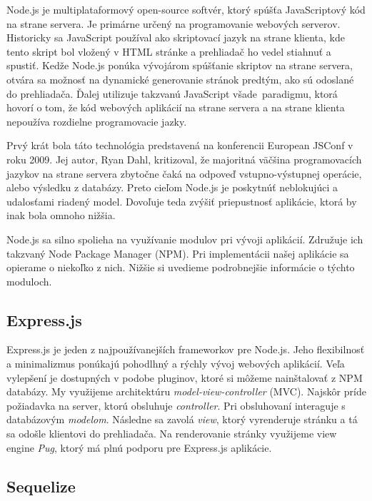 Node.js je multiplataformový open-source softvér, ktorý spúšťa JavaScriptový
kód na strane servera. Je primárne určený na programovanie webových serverov.
Historicky sa JavaScript používal ako skriptovací jazyk
na strane klienta, kde tento skript bol vložený v HTML stránke a prehliadač ho vedel
stiahnuť a spustiť. Kedže Node.js ponúka vývojárom spúšťanie skriptov na strane servera,
otvára sa možnosť na dynamické generovanie stránok predtým, ako sú odoslané do
prehliadača. Ďalej utilizuje takzvanú \glqq JavaScript všade\grqq~paradigmu, ktorá
hovorí o tom, že kód webových aplikácií na strane servera a na strane klienta nepoužíva rozdielne programovacie jazky.~\cite{bib:nodejs}

Prvý krát bola táto technológia predstavená na konferencii European JSConf v roku 2009.
Jej autor, Ryan Dahl, kritizoval, že majoritná väčšina programovacích jazykov
na strane servera zbytočne čaká na odpoveď vstupno-výstupnej operácie, alebo
výsledku z databázy. Preto cieľom Node.js je poskytnúť neblokujúci a udalosťami
riadený model. Dovoľuje teda zvýšiť priepustnosť aplikácie, ktorá by inak bola omnoho
nižšia.

Node.js sa silno spolieha na využívanie modulov pri vývoji aplikácií. Združuje
ich takzvaný Node Package Manager (NPM). Pri implementácii našej aplikácie sa opierame
o niekoľko z nich. Nižšie si uvedieme podrobnejšie informácie o týchto moduloch. \cite{bib:crawford2017comparison}

\subsection{Express.js}
\label{sec:nodejs:expressjs}

Express.js je jeden z najpoužívanejších frameworkov pre Node.js. Jeho flexibilnosť
a minimalizmus ponúkajú pohodlhný a rýchly vývoj webových aplikácií.
Veľa vylepšení je dostupných v podobe pluginov, ktoré si môžeme nainštalovať z NPM
databázy. My využijeme architektúru \textit{model-view-controller} (MVC). Najskôr príde
požiadavka na server, ktorú obsluhuje \textit{controller}. Pri obsluhovaní
interaguje s databázovým \textit{modelom}. Následne sa zavolá \textit{view}, ktorý 
vyrenderuje stránku a tá sa odošle klientovi do prehliadača. Na renderovanie
stránky využijeme view engine \textit{Pug}, ktorý má plnú podporu pre Express.js
aplikácie.

\subsection{Sequelize}
\label{sec:nodejs:sequelize}

